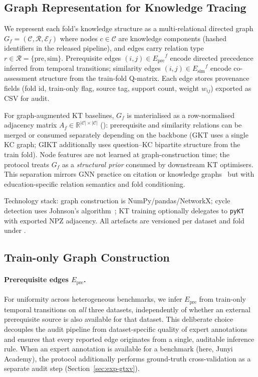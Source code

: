 \documentclass[pdflatex,sn-basic]{sn-jnl}
\newcommand{\Epre}{\ensuremath{E_{\text{pre}}}}
\newcommand{\Esim}{\ensuremath{E_{\text{sim}}}}
\newcommand{\KCs}{knowledge components}
\begin{document}
\subsection{Graph Representation for Knowledge Tracing}
\label{sec:graph-repr}
We represent each fold's knowledge structure as a multi-relational
directed graph $G_f=(\mathcal{C},\mathcal{R},\mathcal{E}_f)$ where
nodes $c\in\mathcal{C}$ are \KCs{} (hashed identifiers in the released
pipeline), and edges carry relation type $r\in\mathcal{R}=\{\text{pre},
\text{sim}\}$. Prerequisite edges $(i,j)\in\Epre^f$ encode directed
precedence inferred from temporal transitions; similarity edges
$(i,j)\in\Esim^f$ encode co-assessment structure from the train-fold
Q-matrix. Each edge stores provenance fields (fold id, train-only flag,
source tag, support count, weight $w_{ij}$) exported as CSV for audit.

For graph-augmented KT baselines, $G_f$ is materialised as a row-normalised
adjacency matrix $A_f\in\mathbb{R}^{|\mathcal{C}|\times|\mathcal{C}|}$
(): prerequisite and similarity relations can be
merged or consumed separately depending on the backbone (GKT uses a single
KC graph; GIKT additionally uses question--KC bipartite structure from the
train fold). Node features are not learned at graph-construction time;
the protocol treats $G_f$ as a \emph{structural prior} consumed by downstream
KT optimisers. This separation mirrors GNN practice on citation or
knowledge graphs~\cite{kipf2017gcn,hamilton2017graphsage} but with
education-specific relation semantics and fold conditioning.

Technology stack: graph construction is NumPy/pandas/NetworkX; cycle
detection uses Johnson's algorithm~\cite{johnson1975finding}; KT training
optionally delegates to \texttt{pyKT}~\cite{liu2022pykt} with exported
NPZ adjacency. All artefacts are versioned per dataset and fold under
.

\subsection{Train-only Graph Construction}
\label{sec:graph}
\paragraph{Prerequisite edges $\Epre$.}
For uniformity across heterogeneous benchmarks, we infer $\Epre$ from
train-only temporal transitions on \emph{all} three datasets,
independently of whether an external prerequisite source is also
available for that dataset. This deliberate choice decouples the audit
pipeline from dataset-specific quality of expert annotations and
ensures that every reported edge originates from a single, auditable
inference rule. When an expert annotation is available for a benchmark
(here, Junyi Academy), the protocol additionally performs ground-truth
cross-validation as a separate audit step (Section~\ref{sec:exp-gtxv}).
\end{document}
